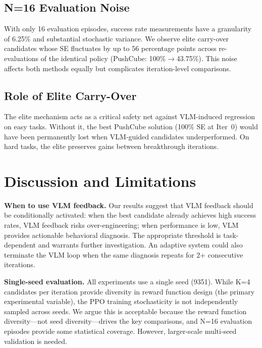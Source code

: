\documentclass[conference]{IEEEtran}
\begin{document}
\subsection{N=16 Evaluation Noise}

With only 16 evaluation episodes, success rate measurements have a granularity
of 6.25\% and substantial stochastic variance. We observe elite carry-over
candidates whose SE fluctuates by up to 56 percentage points across
re-evaluations of the identical policy (PushCube: 100\%$\to$43.75\%). This
noise affects both methods equally but complicates iteration-level comparisons.

\subsection{Role of Elite Carry-Over}

The elite mechanism acts as a critical safety net against VLM-induced regression
on easy tasks. Without it, the best PushCube solution (100\% SE at Iter~0) would
have been permanently lost when VLM-guided candidates underperformed. On hard
tasks, the elite preserves gains between breakthrough iterations.


\section{Discussion and Limitations}

\textbf{When to use VLM feedback.}
Our results suggest that VLM feedback should be conditionally activated: when
the best candidate already achieves high success rates, VLM feedback risks
over-engineering; when performance is low, VLM provides actionable behavioral
diagnosis. The appropriate threshold is task-dependent and warrants further
investigation. An adaptive system could also terminate the VLM loop when the
same diagnosis repeats for 2+ consecutive iterations.

\textbf{Single-seed evaluation.}
All experiments use a single seed (9351). While K=4 candidates per iteration
provide diversity in reward function design (the primary experimental variable),
the PPO training stochasticity is not independently sampled across seeds. We
argue this is acceptable because the reward function diversity---not seed
diversity---drives the key comparisons, and N=16 evaluation episodes provide
some statistical coverage. However, larger-scale multi-seed validation is
needed.
\end{document}
